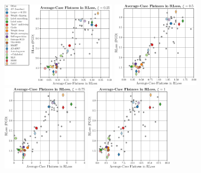 \begin{figure}[t]
	\centering
	\vspace*{-0.2cm}
	\begin{minipage}[t]{0.3\textwidth}
		\vspace*{0px}
		
		\includegraphics[height=3.6cm]{plots_supp_flatness_correlation_seq_loss_e025}
	\end{minipage}
	\begin{minipage}[t]{0.22\textwidth}
		\vspace*{0px}
		
		\includegraphics[height=3.6cm]{plots_supp_flatness_correlation_seq_loss_e05}
	\end{minipage}
	\begin{minipage}[t]{0.22\textwidth}
		\vspace*{0px}
		
		\includegraphics[height=3.6cm]{plots_supp_flatness_correlation_seq_loss_e075}
	\end{minipage}
	\begin{minipage}[t]{0.22\textwidth}
		\vspace*{0px}
		
		\includegraphics[height=3.6cm]{plots_supp_flatness_correlation_seq_loss_e1}
	\end{minipage}
	\\[6px]
	

\end{figure}
